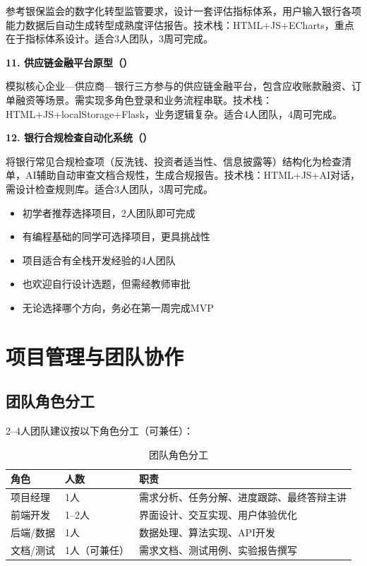 参考银保监会的数字化转型监管要求，设计一套评估指标体系，用户输入银行各项能力数据后自动生成转型成熟度评估报告。技术栈：HTML+JS+ECharts，重点在于指标体系设计。适合3人团队，3周可完成。

\textbf{11. 供应链金融平台原型（）}

模拟核心企业—供应商—银行三方参与的供应链金融平台，包含应收账款融资、订单融资等场景。需实现多角色登录和业务流程串联。技术栈：HTML+JS+localStorage+Flask，业务逻辑复杂。适合4人团队，4周可完成。

\textbf{12. 银行合规检查自动化系统（）}

将银行常见合规检查项（反洗钱、投资者适当性、信息披露等）结构化为检查清单，AI辅助自动审查文档合规性，生成合规报告。技术栈：HTML+JS+AI对话，需设计检查规则库。适合3人团队，3周可完成。

\begin{notebox}[选题建议]
\begin{itemize}[leftmargin=1em]
  \item 初学者推荐选择项目，2人团队即可完成
  \item 有编程基础的同学可选择项目，更具挑战性
  \item {}项目适合有全栈开发经验的4人团队
  \item 也欢迎自行设计选题，但需经教师审批
  \item 无论选择哪个方向，务必在第一周完成MVP
\end{itemize}
\end{notebox}

\section{项目管理与团队协作}

\subsection{团队角色分工}

2--4人团队建议按以下角色分工（可兼任）：

\begin{table}[H]
\centering
\begin{tabular}{llp{6cm}}
\toprule
\textbf{角色} & \textbf{人数} & \textbf{职责} \\
\midrule
项目经理 & 1人 & 需求分析、任务分解、进度跟踪、最终答辩主讲 \\
前端开发 & 1--2人 & 界面设计、交互实现、用户体验优化 \\
后端/数据 & 1人 & 数据处理、算法实现、API开发 \\
文档/测试 & 1人（可兼任） & 需求文档、测试用例、实验报告撰写 \\
\bottomrule
\end{tabular}
\caption{团队角色分工}
\end{table}

